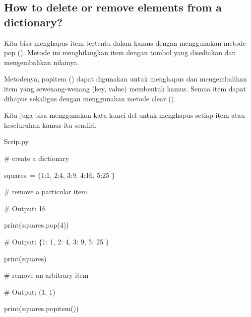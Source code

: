 \documentclass[a4paper,12pt]{report}
\begin{document}
\subsection*{How to delete or remove elements from a dictionary?}
 \par
\noindent 
Kita bisa menghapus item tertentu dalam kamus dengan menggunakan metode pop (). Metode ini menghilangkan item dengan tombol yang disediakan dan mengembalikan nilainya. \par
\noindent 
Metodenya, popitem () dapat digunakan untuk menghapus dan mengembalikan item yang sewenang-wenang (key, value) membentuk kamus. Semua item dapat dihapus sekaligus dengan menggunakan metode clear (). \par
\noindent 
Kita juga bisa menggunakan kata kunci del untuk menghapus setiap item atau keseluruhan kamus itu sendiri. \par
\vspace{12pt}
\noindent 
Scrip.py \par
\vspace{12pt}
\noindent 
 \hspace*{0.5in}  $  \#  $ create a dictionary \par
\noindent 
 \hspace*{0.5in} squares~=  $  \{  $1:1, 2:4, 3:9, 4:16, 5:25 $  \}  $   \par
\vspace{12pt}
\noindent 
 \hspace*{0.5in}  $  \#  $ remove a particular item \par
\noindent 
 \hspace*{0.5in}  $  \#  $ Output: 16 \par
\noindent 
 \hspace*{0.5in} print(squares.pop(4))~  \par
\vspace{12pt}
\noindent 
 \hspace*{0.5in}  $  \#  $ Output:  $  \{  $1: 1, 2: 4, 3: 9, 5: 25 $  \}  $ \par
\noindent 
 \hspace*{0.5in} print(squares) \par
\vspace{12pt}
\noindent 
 \hspace*{0.5in}  $  \#  $ remove an arbitrary item \par
\noindent 
 \hspace*{0.5in}  $  \#  $ Output: (1, 1) \par
\noindent 
 \hspace*{0.5in} print(squares.popitem()) \par
\end{document}
